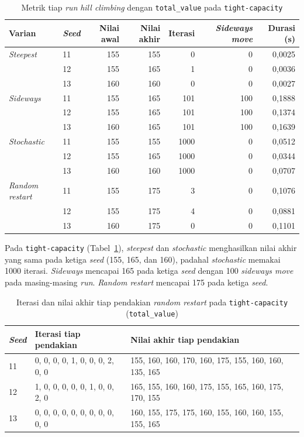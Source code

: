 \begin{table}[H]
    \centering
    \small
    \begin{tabular}{@{}llrrrrr@{}}
        \toprule
        Varian & \textit{Seed} & Nilai awal & Nilai akhir & Iterasi & \textit{Sideways move} & Durasi (s) \\
        \midrule
        \textit{Steepest} & 11 & 155 & 155 & 0 & 0 & 0,0025 \\
         & 12 & 155 & 165 & 1 & 0 & 0,0036 \\
         & 13 & 160 & 160 & 0 & 0 & 0,0027 \\
        \midrule
        \textit{Sideways} & 11 & 155 & 165 & 101 & 100 & 0,1888 \\
         & 12 & 155 & 165 & 101 & 100 & 0,1374 \\
         & 13 & 160 & 165 & 101 & 100 & 0,1639 \\
        \midrule
        \textit{Stochastic} & 11 & 155 & 155 & 1000 & 0 & 0,0512 \\
         & 12 & 155 & 165 & 1000 & 0 & 0,0344 \\
         & 13 & 160 & 160 & 1000 & 0 & 0,0707 \\
        \midrule
        \textit{Random restart} & 11 & 155 & 175 & 3 & 0 & 0,1076 \\
         & 12 & 155 & 175 & 4 & 0 & 0,0881 \\
         & 13 & 160 & 175 & 0 & 0 & 0,1101 \\
        \bottomrule
    \end{tabular}
    \caption{Metrik tiap \textit{run} \textit{hill climbing} dengan \texttt{total\_value} pada \texttt{tight-capacity}}
    \label{tab:hc-metrik-tight}
\end{table}

Pada \texttt{tight-capacity} (Tabel~\ref{tab:hc-metrik-tight}), \textit{steepest} dan \textit{stochastic} menghasilkan nilai akhir yang sama pada ketiga \textit{seed} (155, 165, dan 160), padahal \textit{stochastic} memakai 1000 iterasi. \textit{Sideways} mencapai 165 pada ketiga \textit{seed} dengan 100 \textit{sideways move} pada masing-masing \textit{run}. \textit{Random restart} mencapai 175 pada ketiga \textit{seed}.

\begin{table}[H]
    \centering
    \small
    \begin{tabular}{@{}lp{4.6cm}p{6.4cm}@{}}
        \toprule
        \textit{Seed} & Iterasi tiap pendakian & Nilai akhir tiap pendakian \\
        \midrule
        11 & 0, 0, 0, 0, 1, 0, 0, 0, 2, 0, 0 & 155, 160, 160, 170, 160, 175, 155, 160, 160, 135, 165 \\
        12 & 1, 0, 0, 0, 0, 0, 1, 0, 0, 2, 0 & 165, 155, 160, 160, 175, 155, 165, 160, 175, 170, 155 \\
        13 & 0, 0, 0, 0, 0, 0, 0, 0, 0, 0, 0 & 160, 155, 175, 175, 160, 155, 160, 160, 155, 155, 165 \\
        \bottomrule
    \end{tabular}
    \caption{Iterasi dan nilai akhir tiap pendakian \textit{random restart} pada \texttt{tight-capacity} (\texttt{total\_value})}
    \label{tab:hc-restart-tight}
\end{table}

